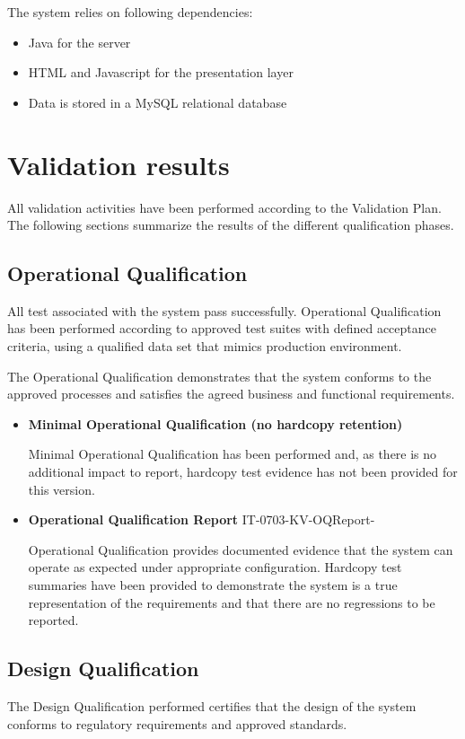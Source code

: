 \documentclass[11pt,a4paper,oneside]{article}
\begin{document}
The system relies on following dependencies:

\begin{itemize}
	\item Java for the server
	\item HTML and Javascript for the presentation layer
	\item Data is stored in a MySQL relational database
\end{itemize}

\section{Validation results}
All validation activities have been performed according to the Validation Plan. The following sections summarize the results of the different qualification phases.

\subsection{Operational Qualification}
All test associated with the system pass successfully. Operational Qualification has been performed according to approved test suites with defined acceptance criteria, using a qualified data set that mimics production environment.

The Operational Qualification demonstrates that the system conforms to the approved processes and satisfies the agreed business and functional requirements.

\begin{itemize}
	\item \textbf{Minimal Operational Qualification (no hardcopy retention)}

	Minimal Operational Qualification has been performed and, as there is no additional impact to report, hardcopy test evidence has not been provided for this version.
	\item \textbf{Operational Qualification Report} IT-0703-KV-OQReport-\version

	Operational Qualification provides documented evidence that the system can operate as expected under appropriate configuration. Hardcopy test summaries have been provided to demonstrate the system is a true representation of the requirements and that there are no regressions to be reported.
\end{itemize}

\subsection{Design Qualification}
The Design Qualification performed certifies that the design of the system conforms to regulatory requirements and approved standards.
\end{document}
